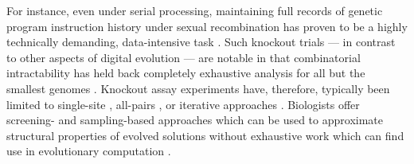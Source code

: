 For instance, even under serial processing, maintaining full records of genetic program instruction history under sexual recombination has proven to be a highly technically demanding, data-intensive task \citep{mcphee2016using,mcphee2017visualizaing}.
Such knockout trials --- in contrast to other aspects of digital evolution --- are notable in that combinatorial intractability has held back completely exhaustive analysis for all but the smallest genomes \citep{nitash2021information}.
Knockout assay experiments have, therefore, typically been limited to single-site \citep{adami2006digital}, all-pairs \citep{kumawat2024evolution}, or iterative approaches \citep{langdon2014improving,moreno2021case}.
Biologists offer screening- and sampling-based approaches \citep{amstrup2005handbook,mackenzie2017ccupancy,amsterdam2004identification,glanville2009precise} which can be used to approximate structural properties of evolved solutions without exhaustive work which can find use in evolutionary computation \citep{moreno2024cryptic}.
